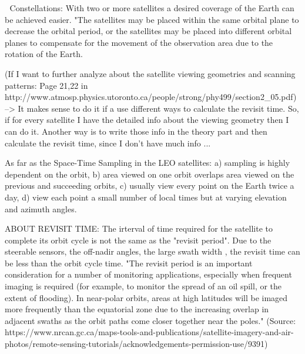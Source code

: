   Constellations: With two or more satellites a desired coverage of the Earth can be achieved easier. "The satellites may be placed within the same orbital plane to decrease the orbital period, or the satellites may be placed into different orbital planes to compensate for the movement of the observation area due to the rotation of the Earth.

(If I want to further analyze about the satellite viewing geometries and scanning patterns: Page 21,22 in http://www.atmosp.physics.utoronto.ca/people/strong/phy499/section2_05.pdf) --> It makes sense to do it if a use different ways to calculate the revisit time. So, if for every satellite I have the detailed info about the viewing geometry then I can do it. Another way is to write those info in the theory part and then calculate the revisit time, since I don't have much info ...

As far as the Space-Time Sampling in the LEO satellites: a) sampling is highly dependent on the orbit, b) area viewed on one orbit overlaps area viewed on the previous and succeeding orbits, c) usually view every point on the Earth twice a day, d) view each point a small number of local times but at varying elevation and azimuth angles.

ABOUT REVISIT TIME:
The irterval of time required for the satellite to complete its orbit cycle is not the same as the "revisit period". Due to the steerable sensors, the off-nadir angles, the large swath width , the revisit time can be less than the orbit cycle time. "The revisit period is an important consideration for a number of monitoring applications, especially when frequent imaging is required (for example, to monitor the spread of an oil spill, or the extent of flooding). In near-polar orbits, areas at high latitudes will be imaged more frequently than the equatorial zone due to the increasing overlap in adjacent swaths as the orbit paths come closer together near the poles." (Source: https://www.nrcan.gc.ca/maps-tools-and-publications/satellite-imagery-and-air-photos/remote-sensing-tutorials/acknowledgements-permission-use/9391)

%

